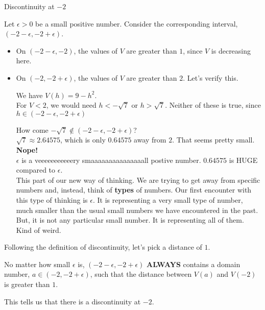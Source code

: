 \documentclass{ximera}
\begin{document}
\begin{explanation} Discontinuity at $-2$


Let $\epsilon > 0$ be a small positive number.  Consider the corresponding interval, $(-2 - \epsilon, -2 + \epsilon)$.

\begin{itemize}
\item On $(-2 - \epsilon, -2)$, the values of $V$ are greater than $1$, since $V$ is decreasing here.
\item On $(-2, -2 + \epsilon)$, the values of $V$ are greater than $2$.  Let's verify this.



We have $V(h) = 9 - h^2$. \\

For $V < 2$, we would need $h < -\sqrt{7}$ or $h > \sqrt{7}$.  Neither of these is true, since $h \in (-2 - \epsilon, -2 + \epsilon)$


\begin{idea}

How come $-\sqrt{7} \notin (-2 - \epsilon, -2 + \epsilon)$? \\


$\sqrt{7} \approx 2.64575$, which is only $0.64575$ away from $2$. That seems pretty small. \\


\textbf{\textcolor{red!80!black}{Nope!}} \\


$\epsilon$ is a veeeeeeeeeeery smaaaaaaaaaaaaaaall postive number.  $0.64575$ is HUGE compared to $\epsilon$. \\


This part of our new way of thinking.  We are trying to get away from specific numbers and, instead, think of \textbf{types} of numbers.  Our first encounter with this type of thinking is $\epsilon$.  It is representing a very small type of number, much smaller than the usual small numbers we have encountered in the past.  But, it is not any particular small number.  It is representing all of them. Kind of weird.







\end{idea}


\end{itemize}



Following the definition of discontinuity, let's pick a distance of $1$.


No matter how small $\epsilon$ is, $(-2 - \epsilon, -2 + \epsilon)$ \textbf{\textcolor{red!90!darkgray}{ALWAYS}} contains a domain number, $a \in (-2, -2 + \epsilon)$, such that the distance between $V(a)$ and $V(-2)$ is greater than $1$.

This tells us that there is a discontinuity at $-2$.

\end{explanation}
\end{document}
